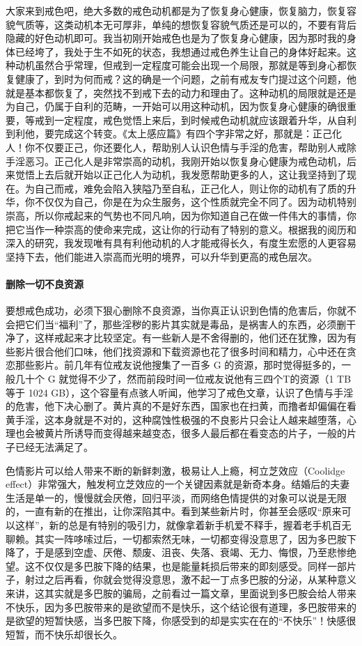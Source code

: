 大家来到戒色吧，绝大多数的戒色动机都是为了恢复身心健康，恢复脑力，恢复容貌气质等，这类动机本无可厚非，单纯的想恢复容貌气质还是可以的，不要有背后隐藏的好色动机即可。我当初刚开始戒色也是为了恢复身心健康，因为那时我的身体已经垮了，我处于生不如死的状态，我想通过戒色养生让自己的身体好起来。这种动机虽然合乎常理，但戒到一定程度可能会出现一个局限，那就是等到身心都恢复健康了，到时为何而戒？这的确是一个问题，之前有戒友专门提过这个问题，他就是基本都恢复了，突然找不到戒下去的动力和理由了。这种动机的局限就是还是为自己，仍属于自利的范畴，一开始可以用这种动机，因为恢复身心健康的确很重要，等戒到一定程度，戒色觉悟上来后，到时候戒色动机就应该跟着升华，从自利到利他，要完成这个转变。《太上感应篇》有四个字非常之好，那就是：正己化人！你不仅要正己，你还要化人，帮助别人认识色情与手淫的危害，帮助别人戒除手淫恶习。正己化人是非常崇高的动机，我刚开始以恢复身心健康为戒色动机，后来觉悟上去后就开始以正己化人为动机，我发愿帮助更多的人，这让我坚持到了现在。为自己而戒，难免会陷入狭隘乃至自私，正己化人，则让你的动机有了质的升华，你不仅仅为自己，你是在为众生服务，这个性质就完全不同了。因为动机特别崇高，所以你戒起来的气势也不同凡响，因为你知道自己在做一件伟大的事情，你把它当作一种崇高的使命来完成，这让你的行动有了特别的意义。根据我的阅历和深入的研究，我发现唯有具有利他动机的人才能戒得长久，有度生宏愿的人更容易坚持下去，他们能进入崇高而光明的境界，可以升华到更高的戒色层次。

\paragraph{删除一切不良资源}

要想戒色成功，必须下狠心删除不良资源，当你真正认识到色情的危害后，你就不会把它们当“福利”了，那些淫秽的影片其实就是毒品，是祸害人的东西，必须删干净了，这样戒起来才比较坚定。有一些新人是不舍得删的，他们还在犹豫，因为有些影片很合他们口味，他们找资源和下载资源也花了很多时间和精力，心中还在贪恋那些影片。前几年有位戒友说他搜集了一百多 G 的资源，那时觉得挺多的，一般几十个 G 就觉得不少了，然而前段时间一位戒友说他有三四个T的资源（1 TB 等于 1024 GB），这个容量有点骇人听闻，他学习了戒色文章，认识了色情与手淫的危害，他下决心删了。黄片真的不是好东西，国家也在扫黄，而撸者却偏偏在看黄手淫，这本身就是不对的，这种腐蚀性极强的不良影片只会让人越来越堕落，心理也会被黄片所诱导而变得越来越变态，很多人最后都在看变态的片子，一般的片子已经无法满足了。

色情影片可以给人带来不断的新鲜刺激，极易让人上瘾，柯立芝效应（Coolidge effect）非常强大，触发柯立芝效应的一个关键因素就是新奇本身。结婚后的夫妻生活是单一的，慢慢就会厌倦，回归平淡，而网络色情提供的对象可以说是无限的，一直有新的在推出，让你深陷其中。看到某些新片时，你甚至会感叹“原来可以这样”，新的总是有特别的吸引力，就像拿着新手机爱不释手，握着老手机百无聊赖。其实一阵哆嗦过后，一切都索然无味，一切都变得没意思了，因为多巴胺下降了，于是感到空虚、厌倦、颓废、沮丧、失落、衰竭、无力、悔恨，乃至悲惨绝望。这不仅仅是多巴胺下降的结果，也是能量耗损后带来的即刻感受。同样一部片子，射过之后再看，你就会觉得没意思，激不起一丁点多巴胺的分泌，从某种意义来讲，这其实就是多巴胺的骗局，之前看过一篇文章，里面说到多巴胺会给人带来不快乐，因为多巴胺带来的是欲望而不是快乐，这个结论很有道理，多巴胺带来的是欲望的短暂快感，当多巴胺下降，你感受到的却是实实在在的“不快乐”！快感很短暂，而不快乐却很长久。

